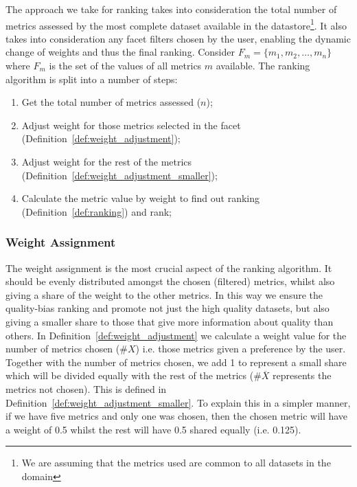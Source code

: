 The approach we take for ranking takes into consideration the total number of metrics assessed by the most complete dataset available in the datastore\footnote{We are assuming that the metrics used are common to all datasets in the domain}.
It also takes into consideration any facet filters chosen by the user, enabling the dynamic change of weights and thus the final ranking.
Consider $F_{m} = \lbrace m_{1},m_{2},\dots,m_{n} \rbrace$ where $F_{m}$ is the set of the values of all metrics $m$ available.
The ranking algorithm is split into a number of steps:
\begin{enumerate}
\item Get the total number of metrics assessed ($n$);
\item Adjust weight for those metrics selected in the facet (Definition~\ref{def:weight_adjustment});
\item Adjust weight for the rest of the metrics (Definition~\ref{def:weight_adjustment_smaller});
\item Calculate the metric value by weight to find out ranking (Definition~\ref{def:ranking}) and rank;
\end{enumerate}

\subsubsection{Weight Assignment}
The weight assignment is the most crucial aspect of the ranking algorithm.
It should be evenly distributed amongst the chosen (filtered) metrics, whilst also giving a share of the weight to the other metrics.
In this way we ensure the quality-bias ranking and promote not just the high quality datasets, but also giving a smaller share to those that give more information about quality than others.
In Definition~\ref{def:weight_adjustment} we calculate a weight value for the number of metrics chosen ($\#X$) i.e. those metrics given a preference by the user.
Together with the number of metrics chosen, we add 1 to represent a small share which will be divided equally with the rest of the metrics ($\#\overline{X}$ represents the metrics not chosen).
This is defined in Definition~\ref{def:weight_adjustment_smaller}.
To explain this in a simpler manner, if we have five metrics and only one was chosen, then the chosen metric will have a weight of 0.5 whilst the rest will have 0.5 shared equally (i.e. 0.125).


